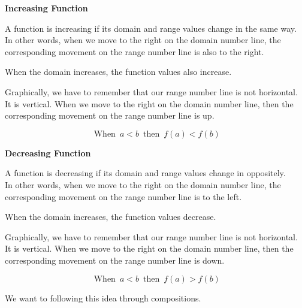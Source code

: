 \documentclass{ximera}
\begin{document}
\begin{template} \textbf{\textcolor{blue!55!black}{Increasing Function}} 


A function is increasing if its domain and range values change in the same way. \\


In other words, when we move to the right on the domain number line, the corresponding movement on the range number line is also to the right.

When the domain increases, the function values also increase.


Graphically, we have to remember that our range number line is not horizontal.  It is vertical.  When we move to the right on the domain number line, then the corresponding movement on the range number line is up.



\[
\text{ When } \,  a < b \, \text{ then } \, f(a) < f(b)
\]


\end{template}














\begin{template} \textbf{\textcolor{blue!55!black}{Decreasing Function}} 


A function is decreasing if its domain and range values change in oppositely. \\


In other words, when we move to the right on the domain number line, the corresponding movement on the range number line is to the left.

When the domain increases, the function values decrease.


Graphically, we have to remember that our range number line is not horizontal.  It is vertical.  When we move to the right on the domain number line, then the corresponding movement on the range number line is down.



\[
\text{ When } \,  a < b \, \text{ then } \, f(a) > f(b)
\]


\end{template}






We want to following this idea through compositions.   \\
\end{document}
